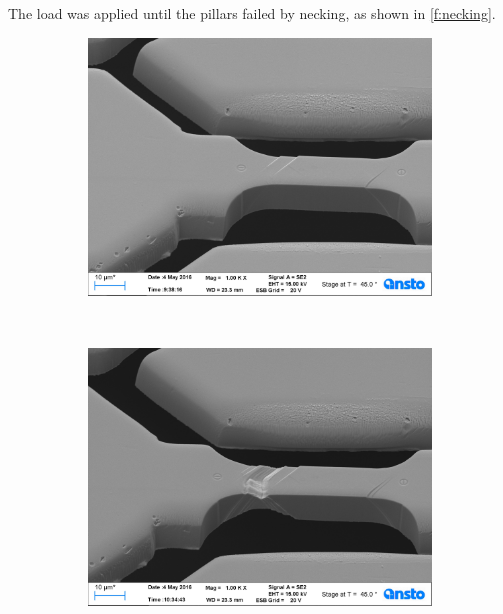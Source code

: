The load was applied until the pillars failed by necking, as shown in \cref{f:necking}.
\begin{figure}
    \centering
    \begin{subfigure}[t]{0.3\linewidth}
        \centering
        \includegraphics[width=\linewidth]{../data/Ni016.jpg}
    \end{subfigure}
    ~
    \begin{subfigure}[t]{0.3\linewidth}
        \centering
        \includegraphics[width=\linewidth]{../data/Ni023.jpg}
    \end{subfigure}
    ~
    \begin{subfigure}[t]{0.3\linewidth}
        \centering

\end{subfigure}
\end{figure}
